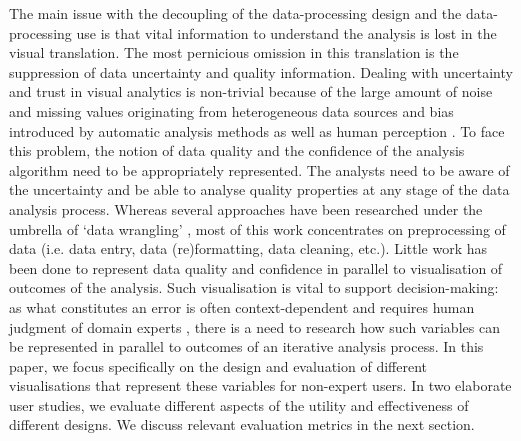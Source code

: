 \documentclass[final,5p,times,twocolumn,authoryear]{elsarticle}
\begin{document}
The main issue with the decoupling of the data-processing design and the data-processing use is that vital information to understand the analysis is lost in the visual translation. The most pernicious omission in this translation is the suppression of data uncertainty and quality information. Dealing with uncertainty and trust in visual analytics is non-trivial because of the large amount of noise and missing values originating from heterogeneous data sources and bias introduced by automatic analysis methods as well as human perception \citep{thomas2009challenges}. To face this problem, the notion of data quality and the confidence of the analysis algorithm need to be appropriately represented. The analysts need to be aware of the uncertainty and be able to analyse quality properties at any stage of the data analysis process. Whereas several approaches have been researched under the umbrella of ‘data wrangling’ \citep{kandel2011research}, most of this work concentrates on preprocessing of data (i.e. data entry, data (re)formatting, data cleaning, etc.). Little work has been done to represent data quality and confidence in parallel to visualisation of outcomes of the analysis. Such visualisation is vital to support decision-making: as what constitutes an error is often context-dependent and requires human judgment of domain experts \citep{kandel2012profiler}, there is a need to research how such variables can be represented in parallel to outcomes of an iterative analysis process. In this paper, we focus specifically on the design and evaluation of different visualisations that represent these variables for non-expert users. In two elaborate user studies, we evaluate different aspects of the utility and effectiveness of different designs. We discuss relevant evaluation metrics in the next section. 

\end{document}
